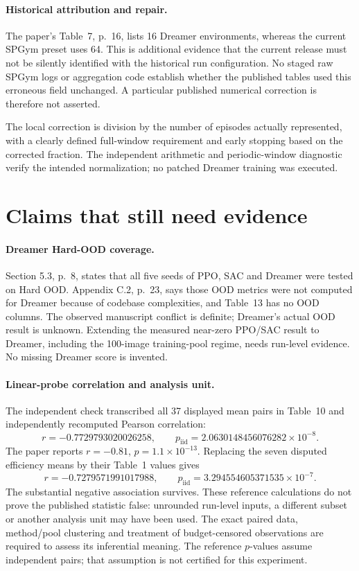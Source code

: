 \documentclass[10pt]{article}
\begin{document}
\paragraph*{Historical attribution and repair.}\mbox{}\par
The paper’s Table 7, p. 16, lists 16 Dreamer environments, whereas the current SPGym preset uses 64. This is additional evidence that the current release must not be silently identified with the historical run configuration. No staged raw SPGym logs or aggregation code establish whether the published tables used this erroneous field unchanged. A particular published numerical correction is therefore not asserted.\par
The local correction is division by the number of episodes actually represented, with a clearly defined full-window requirement and early stopping based on the corrected fraction. The independent arithmetic and periodic-window diagnostic verify the intended normalization; no patched Dreamer training was executed.\par
\section*{Claims that still need evidence}
\paragraph*{Dreamer Hard-OOD coverage.}\mbox{}\par
Section 5.3, p. 8, states that all five seeds of PPO, SAC and Dreamer were tested on Hard OOD. Appendix C.2, p. 23, says those OOD metrics were not computed for Dreamer because of codebase complexities, and Table 13 has no OOD columns. The observed manuscript conflict is definite; Dreamer’s actual OOD result is unknown. Extending the measured near-zero PPO/SAC result to Dreamer, including the 100-image training-pool regime, needs run-level evidence. No missing Dreamer score is invented.\par
\paragraph*{Linear-probe correlation and analysis unit.}\mbox{}\par
The independent check transcribed all 37 displayed mean pairs in Table 10 and independently recomputed Pearson correlation: \[r=-0.7729793020026258,\qquad
 p_{\mathrm{iid}}=2.0630148456076282\times10^{-8}.\] The paper reports \(r=-0.81\), \(p=1.1\times10^{-13}\). Replacing the seven disputed efficiency means by their Table 1 values gives \[r=-0.7279571991017988,\qquad
 p_{\mathrm{iid}}=3.294554605371535\times10^{-7}.\] The substantial negative association survives. These reference calculations do not prove the published statistic false: unrounded run-level inputs, a different subset or another analysis unit may have been used. The exact paired data, method/pool clustering and treatment of budget-censored observations are required to assess its inferential meaning. The reference \(p\)-values assume independent pairs; that assumption is not certified for this experiment.\par
\end{document}
